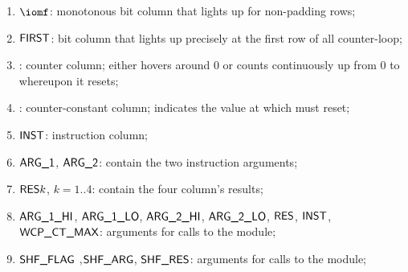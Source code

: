 \begin{enumerate}
	\item $\iomf$:
	monotonous bit column that lights up for non-padding rows;
	\item $\textsf{FIRST}$:
		bit column that lights up precisely at the first row of all counter-loop;
	 \item \ct{}:
	counter column; 
	either hovers around $0$ or counts continuously up from $0$ to \maxCt{} whereupon it resets;
    \item \maxCt:
	counter-constant column;
	indicates the value at which \ct{} must reset;
	\item $\textsf{INST}{}$:
	\godGiven{}
	instruction column;
    \item $\textsf{ARG}\textsf{\_1}$, $\textsf{ARG}\textsf{\_2}$:
	\godGiven{}
	contain the two instruction arguments;
	\item $\textsf{RES}{k}$, $k=1..4$:
	contain the four column's results;
	\item $\textsf{ARG}\textsf{\_1}\textsf{\_HI}$, $\textsf{ARG}\textsf{\_1}\textsf{\_LO}$, $\textsf{ARG}\textsf{\_2}\textsf{\_HI}$, $\textsf{ARG}\textsf{\_2}\textsf{\_LO}$, $\textsf{RES}$, $\textsf{INST}$, $\textsf{WCP\_CT\_MAX}$:
	arguments for calls to the \wcpMod{} module;
	\item $\textsf{SHF\_FLAG}$ ,$\textsf{SHF\_ARG}$, $\textsf{SHF\_RES}$:
	arguments for calls to the \shfMod{} module;
\end{enumerate}